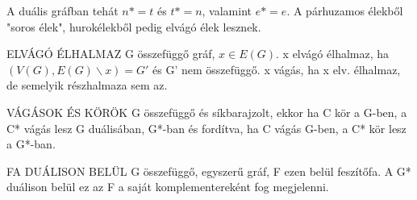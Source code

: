 A duális gráfban tehát $n* = t$ és $t* = n$, valamint $e* = e$.
A párhuzamos élekből "soros élek", hurokélekből pedig elvágó élek lesznek.

\begin{definicio}{ELVÁGÓ ÉLHALMAZ}
G összefüggő gráf, $x \in E(G)$. x elvágó élhalmaz, ha $(V(G),E(G)\backslash x) = G'$ és G' nem összefüggő. x vágás, ha x elv. élhalmaz, de semelyik részhalmaza sem az.
\end{definicio}

\begin{tetel}{VÁGÁSOK ÉS KÖRÖK}
G összefüggő és síkbarajzolt, ekkor ha C kör a G-ben, a C* vágás lesz G duálisában, G*-ban és fordítva, ha C vágás G-ben, a C* kör lesz a G*-ban.
\end{tetel}

\begin{tetel}{FA DUÁLISON BELÜL}
G összefüggő, egyszerű gráf, F ezen belül feszítőfa. A G* duálison belül ez az F a saját komplementereként fog megjelenni.
\end{tetel}
